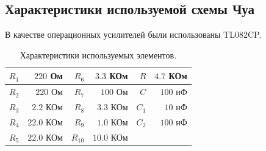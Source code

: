 \documentclass[12pt]{article}
\begin{document}
\subsection*{Характеристики используемой схемы Чуа}
В качестве операционных усилителей были использованы TL082CP.
\begin{table}[H]
	\centering
	\begin{tabular}{|r|r|r|r|r|r|}
		\hline
		$R_1$ & $220$ Ом   & $R_6$    & $3.3$ КОм  & $R$   & $4.7$ КОм \\ \hline
		$R_2$ & $220$ Ом   & $R_7$    & $100$ Ом   & $C$   & $100$ нФ  \\ \hline
		$R_3$ & $2.2$ КОм  & $R_8$    & $3.3$ КОм  & $C_1$ & $10$ нФ   \\ \hline
		$R_4$ & $22.0$ КОм & $R_9$    & $1.0$ КОм  & $C_2$ & $100$ нФ  \\ \hline
		$R_5$ & $22.0$ КОм & $R_{10}$ & $10.0$ КОм &       &           \\ \hline
	\end{tabular}
	\caption{Характеристики используемых элементов.}
	\label{tab:curcuit_chars}
\end{table}
\end{document}

